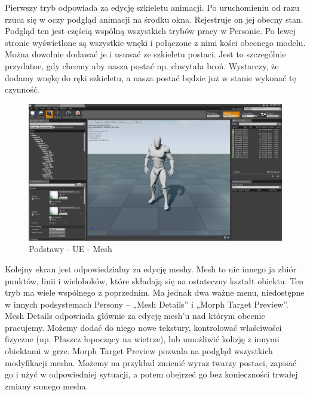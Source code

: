 \documentclass[openright]{xmgr}
\begin{document}
Pierwszy tryb odpowiada za edycję szkieletu animacji. Po uruchomieniu od razu rzuca się w oczy podgląd animacji na środku okna. Rejestruje on jej obecny stan. Podgląd ten jest częścią wspólną wszystkich trybów pracy w Personie. Po lewej stronie wyświetlone są wszystkie wnęki i połączone z nimi kości obecnego modelu. Można dowolnie dodawać je i usuwać ze szkieletu postaci. Jest to szczególnie przydatne, gdy chcemy aby nasza postać np. chwytała broń. Wystarczy, że dodamy wnękę do ręki szkieletu, a nasza postać będzie już w stanie wykonać tę czynność.

\begin{figure}[!htb]
    \begin{center}
    \includegraphics[scale=0.25]{Screeny/Mesh}
    \end{center}
    \caption{Podstawy - UE - Mesh}
\end{figure}

Kolejny ekran jest odpowiedzialny za edycję meshy. Mesh to nic innego ja zbiór punktów, linii i wieloboków, które składają się na ostateczny kształt obiektu.
Ten tryb ma wiele wspólnego z poprzednim. Ma jednak dwa ważne menu, niedostępne w innych podsystemach Persony – „Mesh Details” i „Morph Target Preview”.
Mesh Details odpowiada głównie za edycję mesh’u nad którym obecnie pracujemy. Możemy dodać do niego nowe tekstury, kontrolować właściwości fizyczne (np. Płaszcz łopoczący na wietrze), lub umożliwić kolizję z innymi obiektami w grze.
Morph Target Preview pozwala na podgląd wszystkich modyfikacji mesha. Możemy na przykład zmienić wyraz twarzy postaci, zapisać go i użyć w odpowiedniej sytuacji, a potem obejrzeć go bez konieczności trwałej zmiany samego mesha.
\end{document}
